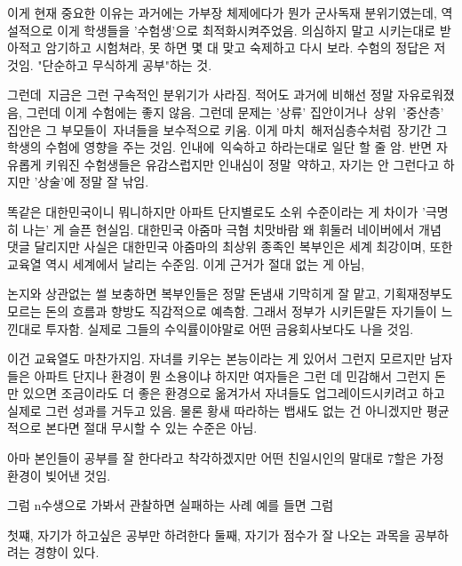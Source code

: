 이게 현재 중요한 이유는
과거에는 가부장 체제에다가 뭔가 군사독재 분위기였는데, 역설적으로 이게 학생들을 '수험생'으로 최적화시켜주었음.
의심하지 말고 시키는대로 받아적고 암기하고 시험쳐라, 못 하면 몇 대 맞고 숙제하고 다시 보라.
수험의 정답은 저것임. "단순하고 무식하게 공부"하는 것.
\vspace{5mm}

그런데 지금은 그런 구속적인 분위기가 사라짐.
적어도 과거에 비해선 정말 자유로워졌음, 그런데 이게 수험에는 좋지 않음.
그런데 문제는 '상류' 집안이거나 상위 '중산층' 집안은 그 부모들이 자녀들을 보수적으로 키움.
이게 마치 해저심층수처럼 장기간 그 학생의 수험에 영향을 주는 것임.
인내에 익숙하고 하라는대로 일단 할 줄 암.
반면 자유롭게 키워진 수험생들은 유감스럽지만 인내심이 정말 약하고,
자기는 안 그런다고 하지만 '상술'에 정말 잘 낚임.
\vspace{5mm}

똑같은 대한민국이니 뭐니하지만 아파트 단지별로도 소위 수준이라는 게 차이가 '극명히 나는' 게 슬픈 현실임.
대한민국 아줌마 극혐 치맛바람 왜 휘둘러 네이버에서 개념 댓글 달리지만 사실은
대한민국 아줌마의 최상위 종족인 복부인은 세계 최강이며, 또한 교육열 역시 세계에서 날리는 수준임.
이게 근거가 절대 없는 게 아님,
\vspace{5mm}

논지와 상관없는 썰 보충하면 복부인들은 정말 돈냄새 기막히게 잘 맡고, 기획재정부도 모르는 돈의 흐름과 향방도 직감적으로 예측함.
그래서 정부가 시키든말든 자기들이 느낀대로 투자함. 실제로 그들의 수익률이야말로 어떤 금융회사보다도 나을 것임.
\vspace{5mm}

이건 교육열도 마찬가지임. 자녀를 키우는 본능이라는 게 있어서 그런지 모르지만
남자들은 아파트 단지나 환경이 뭔 소용이냐 하지만 여자들은 그런 데 민감해서 그런지
돈만 있으면 조금이라도 더 좋은 환경으로 옮겨가서 자녀들도 업그레이드시키려고 하고 실제로 그런 성과를 거두고 있음.
물론 황새 따라하는 뱁새도 없는 건 아니겠지만 평균적으로 본다면 절대 무시할 수 있는 수준은 아님.
\vspace{5mm}

아마 본인들이 공부를 잘 한다라고 착각하겠지만
어떤 친일시인의 말대로 7할은 가정환경이 빚어낸 것임.
\vspace{5mm}

그럼 n수생으로 가봐서 관찰하면 실패하는 사례 예를 들면 그럼
\vspace{5mm}

첫쨰, 자기가 하고싶은 공부만 하려한다
둘째, 자기가 점수가 잘 나오는 과목을 공부하려는 경향이 있다.
\vspace{5mm}

